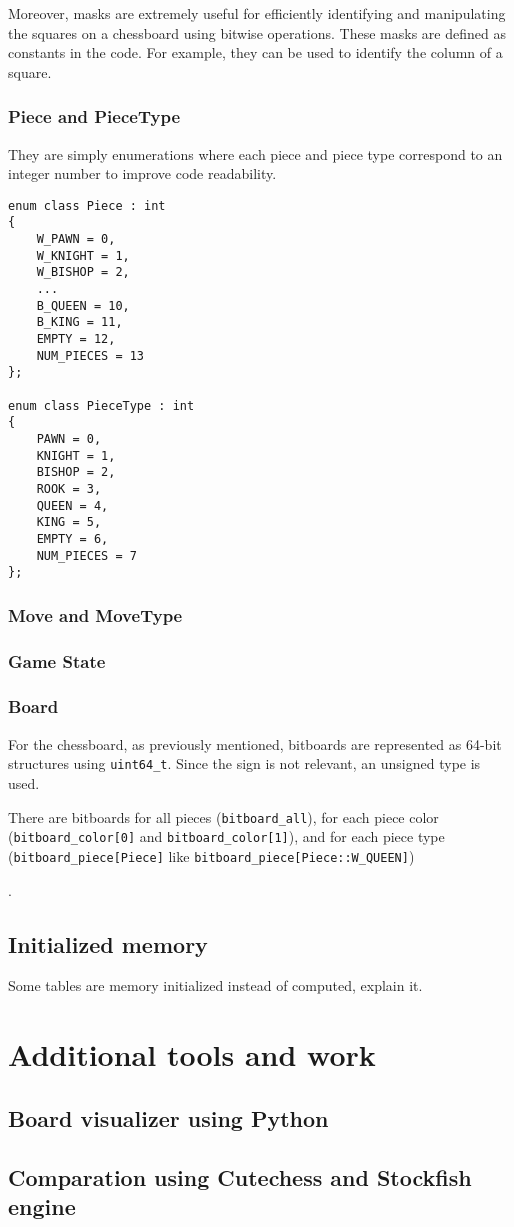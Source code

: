 \noindent Moreover, masks are extremely useful for efficiently identifying and manipulating the squares on a chessboard using bitwise operations. These masks are defined as constants in the code. For example, they can be used to identify the column of a square.

\subsubsection{Piece and PieceType}

They are simply enumerations where each piece and piece type correspond to an integer number to improve code readability.

\begin{lstlisting}
enum class Piece : int
{
    W_PAWN = 0,
    W_KNIGHT = 1,
    W_BISHOP = 2,
    ...
    B_QUEEN = 10,
    B_KING = 11,
    EMPTY = 12,
    NUM_PIECES = 13
};

enum class PieceType : int
{
    PAWN = 0,
    KNIGHT = 1,
    BISHOP = 2,
    ROOK = 3,
    QUEEN = 4,
    KING = 5,
    EMPTY = 6,
    NUM_PIECES = 7
};
\end{lstlisting}

\subsubsection{Move and MoveType}



\subsubsection{Game State}


\subsubsection{Board}

For the chessboard, as previously mentioned, bitboards are represented as 64-bit structures using \texttt{uint64\_t}. Since the sign is not relevant, an unsigned type is used.

\vspace{1em}

\noindent \parbox{\textwidth}{There are bitboards for all pieces (\texttt{bitboard\_all}), for each piece color (\texttt{bitboard\_color[0]} and \texttt{bitboard\_color[1]}), and for each piece type (\texttt{bitboard\_piece[Piece]} like \texttt{bitboard\_piece[Piece::W\_QUEEN]})}.

\subsection{Initialized memory}

Some tables are memory initialized instead of computed, explain it.

\section{Additional tools and work}

\subsection{Board visualizer using Python}

\subsection{Comparation using Cutechess and Stockfish engine}

